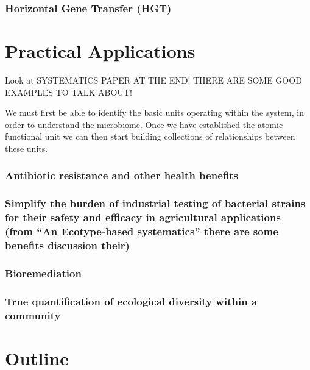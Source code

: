 \subsubsection*{Horizontal Gene Transfer (HGT)}

\section{Practical Applications}
Look at SYSTEMATICS PAPER AT THE END! THERE ARE SOME GOOD EXAMPLES TO TALK ABOUT!

We must first be able to identify the basic units operating within the system, in order to understand the microbiome.
Once we have established the atomic functional unit we can then start building collections of relationships between these units. 

\subsubsection*{Antibiotic resistance and other health benefits}
\subsubsection*{Simplify the burden of industrial testing of bacterial strains for their safety and efficacy in agricultural applications (from ``An Ecotype-based systematics'' there are some benefits discussion their)}
\subsubsection*{Bioremediation}
\subsubsection*{True quantification of ecological diversity within a community}


\section{Outline}%

